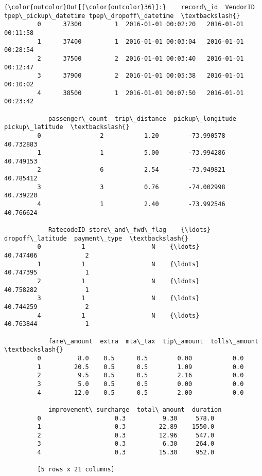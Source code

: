 \documentclass[11pt]{article}
\begin{document}
\begin{Verbatim}[commandchars=\\\{\}]
{\color{outcolor}Out[{\color{outcolor}36}]:}    record\_id  VendorID tpep\_pickup\_datetime tpep\_dropoff\_datetime  \textbackslash{}
         0      37300         1  2016-01-01 00:02:20   2016-01-01 00:11:58   
         1      37400         1  2016-01-01 00:03:04   2016-01-01 00:28:54   
         2      37500         2  2016-01-01 00:03:40   2016-01-01 00:12:47   
         3      37900         2  2016-01-01 00:05:38   2016-01-01 00:10:02   
         4      38500         1  2016-01-01 00:07:50   2016-01-01 00:23:42   
         
            passenger\_count  trip\_distance  pickup\_longitude  pickup\_latitude  \textbackslash{}
         0                2           1.20        -73.990578        40.732883   
         1                1           5.00        -73.994286        40.749153   
         2                6           2.54        -73.949821        40.785412   
         3                3           0.76        -74.002998        40.739220   
         4                1           2.40        -73.992546        40.766624   
         
            RatecodeID store\_and\_fwd\_flag    {\ldots}     dropoff\_latitude  payment\_type  \textbackslash{}
         0           1                  N    {\ldots}            40.747406             2   
         1           1                  N    {\ldots}            40.747395             1   
         2           1                  N    {\ldots}            40.758282             1   
         3           1                  N    {\ldots}            40.744259             2   
         4           1                  N    {\ldots}            40.763844             1   
         
            fare\_amount  extra  mta\_tax  tip\_amount  tolls\_amount  \textbackslash{}
         0          8.0    0.5      0.5        0.00           0.0   
         1         20.5    0.5      0.5        1.09           0.0   
         2          9.5    0.5      0.5        2.16           0.0   
         3          5.0    0.5      0.5        0.00           0.0   
         4         12.0    0.5      0.5        2.00           0.0   
         
            improvement\_surcharge  total\_amount  duration  
         0                    0.3          9.30     578.0  
         1                    0.3         22.89    1550.0  
         2                    0.3         12.96     547.0  
         3                    0.3          6.30     264.0  
         4                    0.3         15.30     952.0  
         
         [5 rows x 21 columns]
\end{Verbatim}
            
\end{document}
